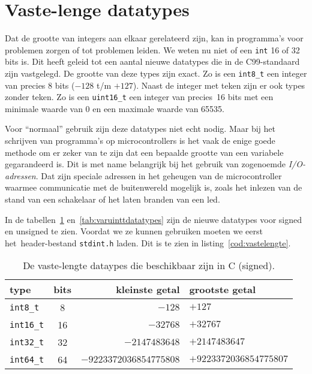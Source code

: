 \section{Vaste-lenge datatypes}
Dat de grootte van integers aan elkaar gerelateerd zijn, kan in programma's voor problemen zorgen of tot problemen leiden. We weten nu niet of een \texttt{int} 16 of 32 bits is. Dit heeft geleid tot een aantal nieuwe datatypes die in de C99-standaard zijn vastgelegd. De grootte van deze types zijn exact. Zo is een \texttt{int8\_t} een integer van precies 8 bits ($-128$ t/m $+127$). Naast de integer met teken zijn er ook types zonder teken. Zo is een \texttt{uint16\_t} een integer van precies~16 bits met een minimale waarde van 0 en een maximale waarde van 65535.

Voor ``normaal'' gebruik zijn deze datatypes niet echt nodig. Maar bij het schrijven van programma's op microcontrollers is het vaak de enige goede methode om er zeker van te zijn dat een bepaalde grootte van een variabele gegarandeerd is. Dit is met name belangrijk bij het gebruik van zogenoemde \textsl{I/O-adressen}. Dat zijn speciale adressen in het geheugen van de microcontroller waarmee communicatie met de buitenwereld mogelijk is, zoals het inlezen van de stand van een schakelaar of het laten branden van een led.

In de tabellen~\ref{tab:varinttdatatypes} en~\ref{tab:varuinttdatatypes} zijn de nieuwe datatypes voor signed en unsigned te zien. Voordat we ze kunnen gebruiken moeten we eerst het\ header-bestand \texttt{stdint.h} laden. Dit is te zien in listing~\ref{cod:vastelengte}.

\begin{table}[!ht]
\centering
\caption{De vaste-lengte dataypes die beschikbaar zijn in C (signed).}
\label{tab:varinttdatatypes}
\begin{tabular}{@{}lcrl@{}}
\toprule
\textbf{type}          & \textbf{bits} & \textbf{kleinste getal} &  \textbf{grootste getal} \\ \midrule
\texttt{int8\_t}       & 8             & $-128$                  & $+127$  \\
\texttt{int16\_t}      & 16            & $-32768$                & $+32767$  \\
\texttt{int32\_t}      & 32            & $-2147483648$           & $+2147483647$  \\
\texttt{int64\_t}      & 64            & $-9223372036854775808$  & $+9223372036854775807$  \\
\bottomrule
\end{tabular}\\
\end{table}

